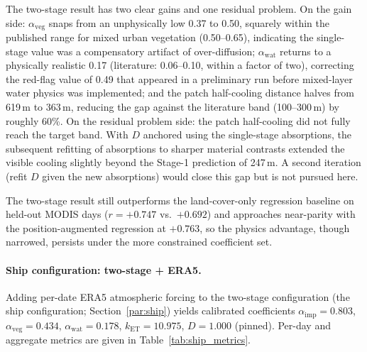 \documentclass[12pt, letterpaper]{article}
\begin{document}
The two-stage result has two clear gains and one residual problem.
On the gain side: $\alpha_{\mathrm{veg}}$ snaps from an unphysically
low 0.37 to 0.50, squarely within the published range for mixed urban
vegetation (0.50--0.65), indicating the single-stage value was a
compensatory artifact of over-diffusion; $\alpha_{\mathrm{wat}}$ returns
to a physically realistic 0.17 (literature: 0.06--0.10, within a factor
of two), correcting the red-flag value of 0.49 that appeared in a
preliminary run before mixed-layer water physics was implemented; and the
patch half-cooling distance halves from 619\,m to 363\,m, reducing the
gap against the literature band (100--300\,m) by roughly 60\%.
On the residual problem side: the patch half-cooling did not fully reach
the target band. With $D$ anchored using the single-stage absorptions,
the subsequent refitting of absorptions to sharper material contrasts
extended the visible cooling slightly beyond the Stage-1 prediction of
247\,m. A second iteration (refit $D$ given the new absorptions) would
close this gap but is not pursued here.

The two-stage result still outperforms the land-cover-only regression
baseline on held-out MODIS days ($r = +0.747$ vs.\ $+0.692$) and
approaches near-parity with the position-augmented regression at
$+0.763$, so the physics advantage, though narrowed, persists under the
more constrained coefficient set.

\paragraph{Ship configuration: two-stage + ERA5.}
\label{sec:ship_results}
Adding per-date ERA5 atmospheric forcing to the two-stage configuration
(the ship configuration; Section~\ref{par:ship}) yields calibrated
coefficients $\alpha_{\mathrm{imp}} = 0.803$, $\alpha_{\mathrm{veg}} =
0.434$, $\alpha_{\mathrm{wat}} = 0.178$, $k_{\mathrm{ET}} = 10.975$,
$D = 1.000$ (pinned). Per-day and aggregate metrics are given in
Table~\ref{tab:ship_metrics}.
\end{document}
